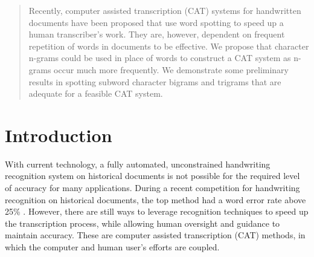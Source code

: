 \documentclass[conference]{IEEEtran}
\begin{document}
\maketitle

\begin{abstract}
Recently, computer assisted transcription (CAT) systems for handwritten documents have been proposed that use word spotting to speed up a human transcriber's work. They are, however, dependent on frequent repetition of words in documents to be effective. We propose that character n-grams could be used in place of words to construct a CAT system as n-grams occur much more frequently. We demonstrate some preliminary results in spotting subword character bigrams and trigrams that are adequate for a feasible CAT system.
\end{abstract}





%
\IEEEpeerreviewmaketitle



\section{Introduction} %
With current technology, a fully automated, unconstrained handwriting recognition system on historical documents is not possible for the required level of accuracy for many applications. During a recent competition for handwriting recognition on historical documents, the top method had a word error rate above 25\% \cite{icdarComp2015}.  %
However, there are still ways to leverage recognition techniques to speed up the transcription process, while allowing human oversight and guidance to maintain accuracy. These are computer assisted transcription (CAT) methods, in which the computer and human user's efforts are coupled.
\end{document}
